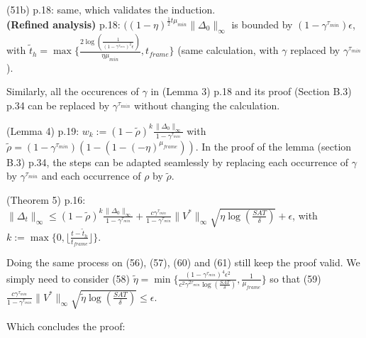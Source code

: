 \documentclass{article}
\begin{document}
  (51b) p.18: same, which validates the induction.\\

  \textbf{(Refined analysis)} p.18: $((1-\eta)^{\frac{1}{2}t \mu_{min}} \|\Delta_0\|_\infty$ is bounded by $(1 - \gamma^{\tau_{min}})\epsilon$, with $\tilde t_h = \max \{\frac{2 \log(\frac{1}{(1-\gamma^{\tau_{min}})^2\epsilon})}{\eta \mu_{min}}, t_{frame} \} $ (same calculation, with $\gamma$ replaced by $\gamma^{\tau_{min}}$).

  Similarly, all the occurences of $\gamma$ in (Lemma 3) p.18 and its proof (Section B.3) p.34 can be replaced by $\gamma^{\tau_{min}}$ without changing the calculation.

  (Lemma 4) p.19: $w_k := (1 - \tilde\rho)^k \frac{\|\Delta_0\|_\infty}{1 - \gamma^{\tau_{min}}}$ with $\tilde\rho = (1-\gamma^{\tau_{min}})(1 - (1-(-\eta)^{\mu_{frame}}))$.
  In the proof of the lemma (section B.3) p.34, the steps can be adapted seamlessly by replacing each occurrence of $\gamma$ by $\gamma^{\tau_{min}}$ and each occurrence of $\rho$ by $\tilde\rho$.

  (Theorem 5) p.16: $\|\Delta_t\|_\infty \leq (1 - \tilde\rho)^k \frac{\|\Delta_0\|_\infty}{1 - \gamma^{\tau_{min}}} + \frac{c \gamma^{\tau_{min}}}{1 - \gamma^{\tau_{min}}} \|V^*\|_\infty \sqrt{\eta \log(\frac{SAT}{\delta})} + \epsilon$, with $k:= \max \{0, \lfloor \frac{t - \tilde t_h}{t_{frame}} \rfloor \}$.

  Doing the same process on (56), (57), (60) and (61) still keep the proof valid. We simply need to consider (58) $\tilde\eta = \min \{ \frac{(1 - \gamma^{\tau_{min}})^4 \epsilon^2}{c^2 \gamma^{2\tau_{min}} \log(\frac{SAT}{\delta})}, \frac{1}{\mu_{frame}} \}$ so that (59) $\frac{c \gamma^{\tau_{min}}}{1 - \gamma^{\tau_{min}}} \|V^*\|_\infty \sqrt{\tilde\eta \log(\frac{SAT}{\delta})} \leq \epsilon$.

  Which concludes the proof:
  
\end{document}
